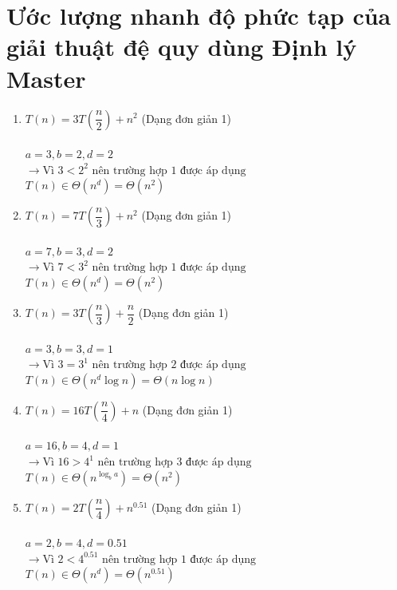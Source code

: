 \documentclass[12pt, letterpaper]{article}
\begin{document}
\section{Ước lượng nhanh độ phức tạp của giải thuật đệ quy dùng Định lý Master}
\begin{enumerate}[label=\bfseries\large\theenumi.]
    \item $ T(n) = 3T\left( \dfrac{n}{2} \right) + n^2 $ (Dạng đơn giản 1) \\ \\
        $ a = 3, b = 2, d = 2 $ \\
        $ \rightarrow \text{Vì } 3 < 2^2 \text{ nên trường hợp 1 được áp dụng} $ \\
        $ T(n) \in \Theta(n^d) = \Theta(n^2) $

    \item $ T(n) = 7T\left( \dfrac{n}{3} \right) + n^2 $ (Dạng đơn giản 1) \\ \\
        $ a = 7, b = 3, d = 2 $ \\
        $ \rightarrow \text{Vì } 7 < 3^2 \text{ nên trường hợp 1 được áp dụng} $ \\
        $ T(n) \in \Theta(n^d) = \Theta(n^2) $

    \item $ T(n) = 3T\left( \dfrac{n}{3} \right) + \dfrac{n}{2} $ (Dạng đơn giản 1) \\ \\
        $ a = 3, b = 3, d = 1 $ \\
        $ \rightarrow \text{Vì } 3 = 3^1 \text{ nên trường hợp 2 được áp dụng} $ \\
        $ T(n) \in \Theta(n^d\log n) = \Theta(n\log n) $

    \item $ T(n) = 16T\left( \dfrac{n}{4} \right) + n $ (Dạng đơn giản 1) \\ \\
        $ a = 16, b = 4, d = 1 $ \\
        $ \rightarrow \text{Vì } 16 > 4^1 \text{ nên trường hợp 3 được áp dụng} $ \\
        $ T(n) \in \Theta(n^{\log_b a}) = \Theta(n^2) $

    \item $ T(n) = 2T\left( \dfrac{n}{4} \right) + n^{0.51} $ (Dạng đơn giản 1) \\ \\
        $ a = 2, b = 4, d = 0.51 $ \\
        $ \rightarrow \text{Vì } 2 < 4^{0.51} \text{ nên trường hợp 1 được áp dụng} $ \\
        $ T(n) \in \Theta(n^d) = \Theta(n^{0.51}) $


\end{enumerate}
\end{document}
